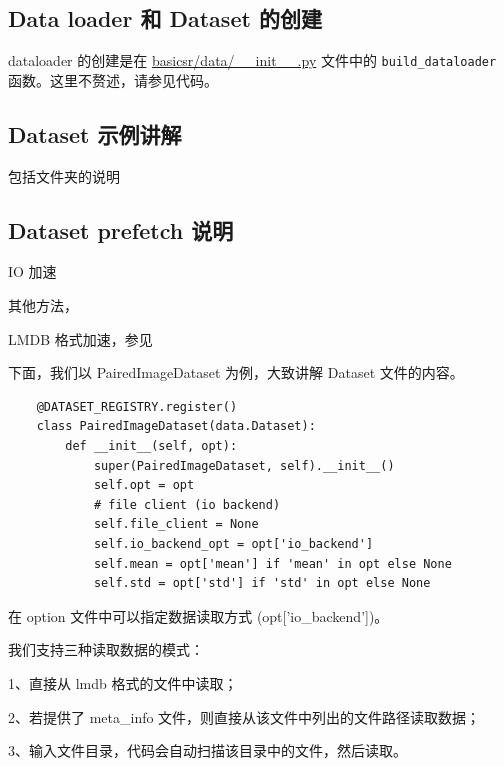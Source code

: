 \documentclass[../main.tex]{subfiles}
\begin{document}
\subsection{Data loader 和 Dataset 的创建}\label{code_structure:dataloader_dataset}

dataloader 的创建是在 \href{https://github.com/XPixelGroup/BasicSR/blob/master/basicsr/data/\_\_init\_\_.py}{basicsr/data/\_\_init\_\_.py} 文件中的 \texttt{build\_dataloader} 函数。这里不赘述，请参见代码。

\subsection{Dataset 示例讲解}\label{code_structure:dataset_example}

包括文件夹的说明
\subsection{Dataset prefetch 说明}\label{code_structure:dataset_prefecth}

IO 加速

其他方法，

LMDB 格式加速，参见



下面，我们以 PairedImageDataset 为例，大致讲解 Dataset 文件的内容。
\begin{verbatim}
    @DATASET_REGISTRY.register()
    class PairedImageDataset(data.Dataset):
        def __init__(self, opt):
            super(PairedImageDataset, self).__init__()
            self.opt = opt
            # file client (io backend)
            self.file_client = None
            self.io_backend_opt = opt['io_backend']
            self.mean = opt['mean'] if 'mean' in opt else None
            self.std = opt['std'] if 'std' in opt else None
    \end{verbatim}

在 option 文件中可以指定数据读取方式 (opt['io\_backend'])。

我们支持三种读取数据的模式：

1、直接从 lmdb 格式的文件中读取；

2、若提供了 meta\_info 文件，则直接从该文件中列出的文件路径读取数据；

3、输入文件目录，代码会自动扫描该目录中的文件，然后读取。
\end{document}
